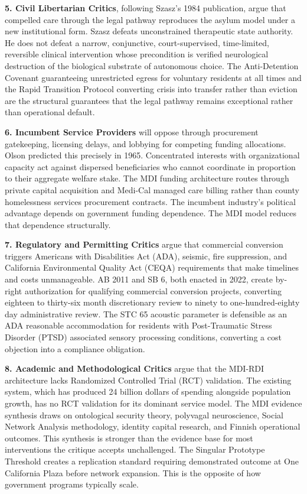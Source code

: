 \documentclass[12pt, letterpaper]{article}
\begin{document}
\textbf{5. Civil Libertarian Critics}, following Szasz's 1984 publication, argue that compelled care through the legal pathway reproduces the asylum model under a new institutional form. Szasz defeats unconstrained therapeutic state authority. He does not defeat a narrow, conjunctive, court-supervised, time-limited, reversible clinical intervention whose precondition is verified neurological destruction of the biological substrate of autonomous choice. The Anti-Detention Covenant guaranteeing unrestricted egress for voluntary residents at all times and the Rapid Transition Protocol converting crisis into transfer rather than eviction are the structural guarantees that the legal pathway remains exceptional rather than operational default.

\textbf{6. Incumbent Service Providers} will oppose through procurement gatekeeping, licensing delays, and lobbying for competing funding allocations. Olson predicted this precisely in 1965. Concentrated interests with organizational capacity act against dispersed beneficiaries who cannot coordinate in proportion to their aggregate welfare stake. The MDI funding architecture routes through private capital acquisition and Medi-Cal managed care billing rather than county homelessness services procurement contracts. The incumbent industry's political advantage depends on government funding dependence. The MDI model reduces that dependence structurally.

\textbf{7. Regulatory and Permitting Critics} argue that commercial conversion triggers Americans with Disabilities Act (ADA), seismic, fire suppression, and California Environmental Quality Act (CEQA) requirements that make timelines and costs unmanageable. AB 2011 and SB 6, both enacted in 2022, create by-right authorization for qualifying commercial conversion projects, converting eighteen to thirty-six month discretionary review to ninety to one-hundred-eighty day administrative review. The STC 65 acoustic parameter is defensible as an ADA reasonable accommodation for residents with Post-Traumatic Stress Disorder (PTSD) associated sensory processing conditions, converting a cost objection into a compliance obligation.

\textbf{8. Academic and Methodological Critics} argue that the MDI-RDI architecture lacks Randomized Controlled Trial (RCT) validation. The existing system, which has produced 24 billion dollars of spending alongside population growth, has no RCT validation for its dominant service model. The MDI evidence synthesis draws on ontological security theory, polyvagal neuroscience, Social Network Analysis methodology, identity capital research, and Finnish operational outcomes. This synthesis is stronger than the evidence base for most interventions the critique accepts unchallenged. The Singular Prototype Threshold creates a replication standard requiring demonstrated outcome at One California Plaza before network expansion. This is the opposite of how government programs typically scale.
\end{document}
